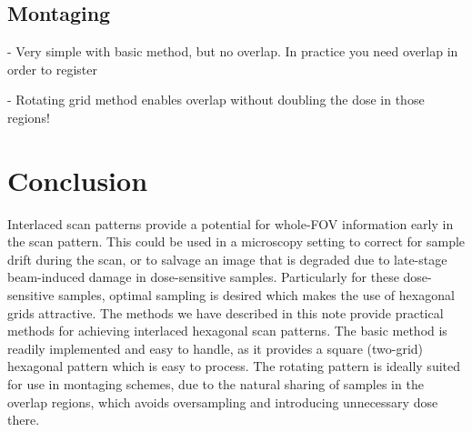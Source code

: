 \documentclass{article}
\begin{document}
\subsection{Montaging}
\label{sec:montaging}

- Very simple with basic method, but no overlap. In practice you need overlap in order to register

- Rotating grid method enables overlap without doubling the dose in those regions!

\section{Conclusion}
\label{sec:conclusion}

Interlaced scan patterns provide a potential for whole-FOV information early in the scan pattern.
%
This could be used in a microscopy setting to correct for sample drift during the scan, or to salvage an image that is degraded due to late-stage beam-induced damage in dose-sensitive samples.
%
Particularly for these dose-sensitive samples, optimal sampling is desired which makes the use of hexagonal grids attractive.
%
The methods we have described in this note provide practical methods for achieving interlaced hexagonal scan patterns.
%
The basic method is readily implemented and easy to handle, as it provides a square (two-grid) hexagonal pattern which is easy to process.
%
The rotating pattern is ideally suited for use in montaging schemes, due to the natural sharing of samples in the overlap regions, which avoids oversampling and introducing unnecessary dose there.



\end{document}
